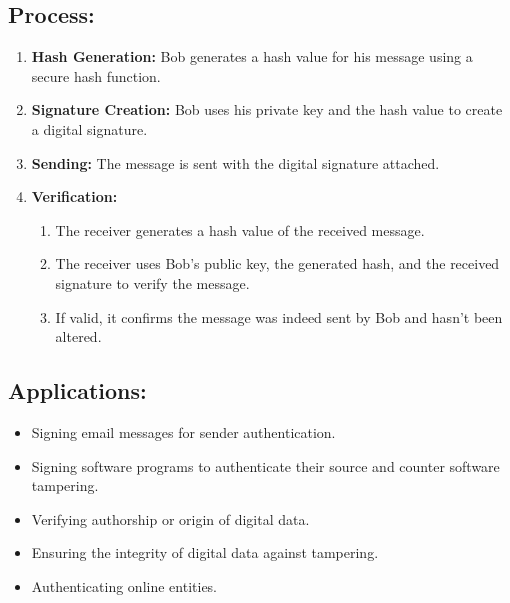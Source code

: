\subsection{Process:}
\begin{enumerate}
    \item \textbf{Hash Generation:} Bob generates a hash value for his message using a secure hash function.
    \item \textbf{Signature Creation:} Bob uses his private key and the hash value to create a digital signature.
    \item \textbf{Sending:} The message is sent with the digital signature attached.
    \item \textbf{Verification:} \begin{enumerate}
    \item The receiver generates a hash value of the received message.
    \item The receiver uses Bob’s public key, the generated hash, and the received signature to verify the message.
    \item If valid, it confirms the message was indeed sent by Bob and hasn’t been altered.
\end{enumerate}
\end{enumerate}


\subsection{Applications:}
\begin{itemize}
    \item Signing email messages for sender authentication.
    \item Signing software programs to authenticate their source and counter software tampering.
    \item Verifying authorship or origin of digital data.
    \item Ensuring the integrity of digital data against tampering.
    \item Authenticating online entities.
\end{itemize}


